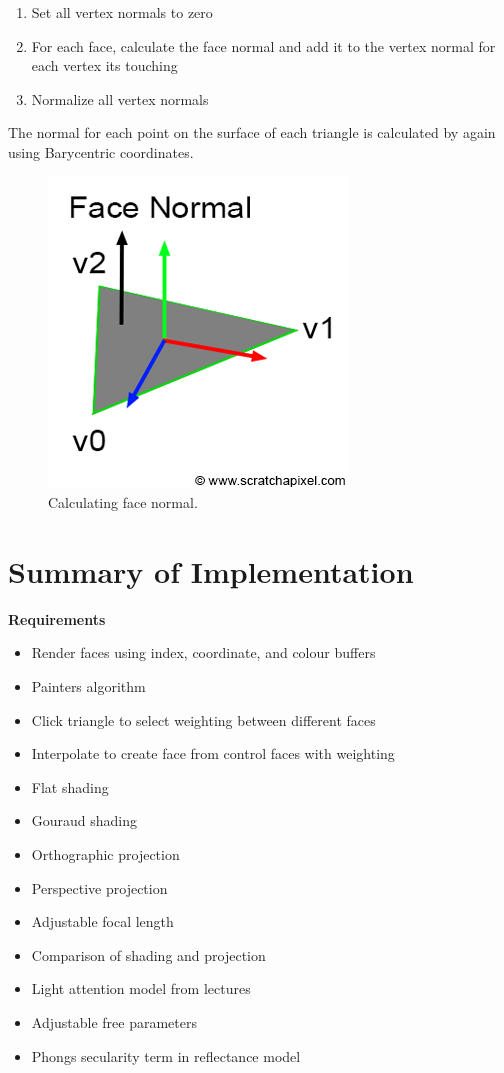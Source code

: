 \documentclass[12pt]{article}
\begin{document}
\begin{enumerate}
    \itemsep0em
\item Set all vertex normals to zero
\item For each face, calculate the face normal and add it to the vertex normal for each vertex its touching
\item Normalize all vertex normals
\end{enumerate}

The normal for each point on the surface of each triangle is calculated by again using Barycentric coordinates.

\begin{figure}[!ht]
	\centering
	\includegraphics[width=0.4\linewidth]{images/tri-normal.png}
    \caption{Calculating face normal.}
	\label{fig:tri_normal}
\end{figure}

\subsection{}

\newpage
\section{Summary of Implementation}
\noindent\textbf{Requirements}
\begin{itemize}
    \itemsep0em
    \item  Render faces using index, coordinate, and colour buffers
    \item  Painters algorithm 
    \item  Click triangle to select weighting between different faces
    \item  Interpolate to create face from control faces with weighting
    \item  Flat shading
    \item  Gouraud shading
    \item  Orthographic projection
    \item  Perspective projection
    \item  Adjustable focal length
    \item  Comparison of shading and projection
    \item  Light attention model from lectures
    \item  Adjustable free parameters
    \item  Phongs secularity term in reflectance model
\end{itemize}
\end{document}
